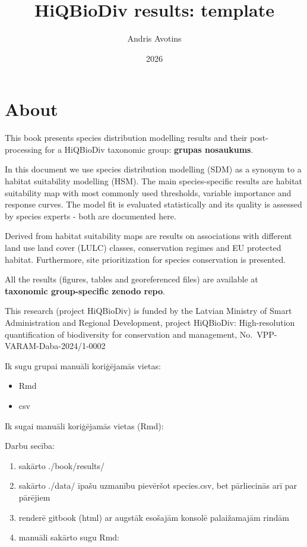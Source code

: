 \documentclass[
  openany]{book}
\title{HiQBioDiv results: template}
\author{Andris Avotins}
\date{2026}
\begin{document}
\maketitle

{
\setcounter{tocdepth}{1}
\tableofcontents
}
\chapter*{About}\label{about}

This book presents species distribution modelling results and their
post-processing for a HiQBioDiv taxonomic group: \textbf{grupas nosaukums}.

In this document we use species distribution modelling (SDM) as a synonym to a
habitat suitability modelling (HSM). The main species-specific results are
habitat suitability map with most commonly used thresholds, variable importance
and response curves. The model fit is evaluated statistically and its quality is
assessed by species experts - both are documented here.

Derived from habitat suitability maps are results on associations with different
land use land cover (LULC) classes, conservation regimes and EU protected habitat.
Furthermore, site prioritization for species conservation is presented.

All the results (figures, tables and georeferenced files) are available at
\textbf{taxonomic group-specific zenodo repo}.

This research (project HiQBioDiv) is funded by the Latvian Ministry of Smart
Administration and Regional Development, project HiQBioDiv: High-resolution
quantification of biodiversity for conservation and management,
No.~VPP-VARAM-Daba-2024/1-0002

Ik sugu grupai manuāli koriģējamās vietas:

\begin{itemize}
\item
  Rmd
\item
  csv
\end{itemize}

Ik sugai manuāli koriģējamās vietas (Rmd):

Darbu secība:

\begin{enumerate}
\def\labelenumi{\arabic{enumi}.}
\item
  sakārto ./book/results/
\item
  sakārto ./data/ īpašu uzmanību pievēršot species.csv, bet pārliecinās arī par pārējiem
\item
  renderē gitbook (html) ar augstāk esošajām konsolē palaižamajām rindām
\item
  manuāli sakārto sugu Rmd:
\end{enumerate}
\end{document}
